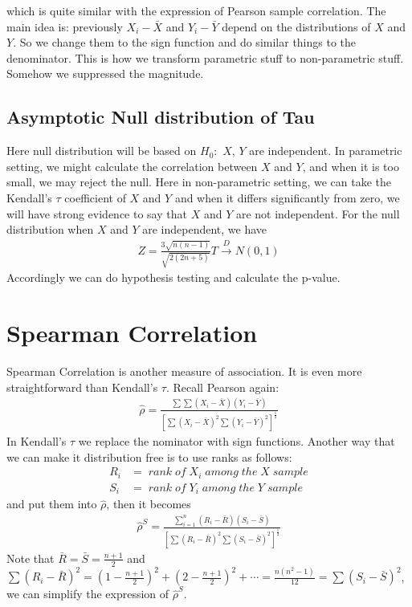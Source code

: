 \documentclass[twoside]{article}
\begin{document}
	which is quite similar with the expression of Pearson sample correlation. The main idea is: previously $X_i - \bar{X}$ and $Y_i - \bar{Y}$ depend on the distributions of $X$ and $Y$. So we change them to the sign function and do similar things to the denominator. This is how we transform parametric stuff to non-parametric stuff. Somehow we suppressed the magnitude. 
	
	\subsection{Asymptotic Null distribution of Tau}
	Here null distribution will be based on $H_0:$ $X$, $Y$ are independent. In parametric setting, we might calculate the correlation between $X$ and $Y$, and when it is too small, we may reject the null. Here in non-parametric setting, we can take the Kendall's $\tau$ coefficient of $X$ and $Y$ and when it differs significantly from zero, we will have strong evidence to say that $X$ and $Y$ are not independent. For the null distribution when $X$ and $Y$ are independent, we have
	\begin{align*}
		Z = \frac{3 \sqrt{n(n-1)}}{\sqrt{2(2n+5)}} T \xrightarrow{D} N(0,1)
	\end{align*}
	Accordingly we can do hypothesis testing and calculate the p-value. 
	\section{Spearman Correlation}
	Spearman Correlation is another measure of association. It is even more straightforward than Kendall's $\tau$. Recall Pearson again: 
	\begin{align*}
		\hat{\rho} = \frac{\sum \sum \left( X_i - \bar{X} \right) \left( Y_i - \bar{Y} \right)}{\left[ \sum \left( X_i - \bar{X} \right)^2 \sum \left( Y_i - \bar{Y} \right)^2 \right]^{\frac{1}{2}}}
	\end{align*}
	In Kendall's $\tau$ we replace the nominator with sign functions. Another way that we can make it distribution free is to use ranks as follows: 
	\begin{align*}
		R_i &= \; rank \; of \; X_i \; among \; the \; X \; sample \\
		S_i &= \; rank \; of \; Y_i \; among \; the \; Y \; sample
	\end{align*}
	and put them into $\hat{\rho}$, then it becomes
	\begin{align*}
		\hat{\rho}^S = \frac{\sum_{i=1}^{n} \left( R_i - \bar{R} \right) \left( S_i - \bar{S} \right)}{\left[ \sum \left( R_i - \bar{R} \right)^2 \sum \left( S_i - \bar{S} \right)^2 \right]^{\frac{1}{2}}}
	\end{align*}
	Note that $\bar{R} = \bar{S} = \frac{n+1}{2}$ and $\sum \left( R_i - \bar{R} \right)^2 = \left( 1 - \frac{n+1}{2} \right)^2 + \left( 2 - \frac{n+1}{2} \right)^2 + \cdots = \frac{n(n^2-1)}{12} = \sum \left( S_i - \bar{S} \right)^2$, we can simplify the expression of $\hat{\rho}^S$. 
	
\end{document}
